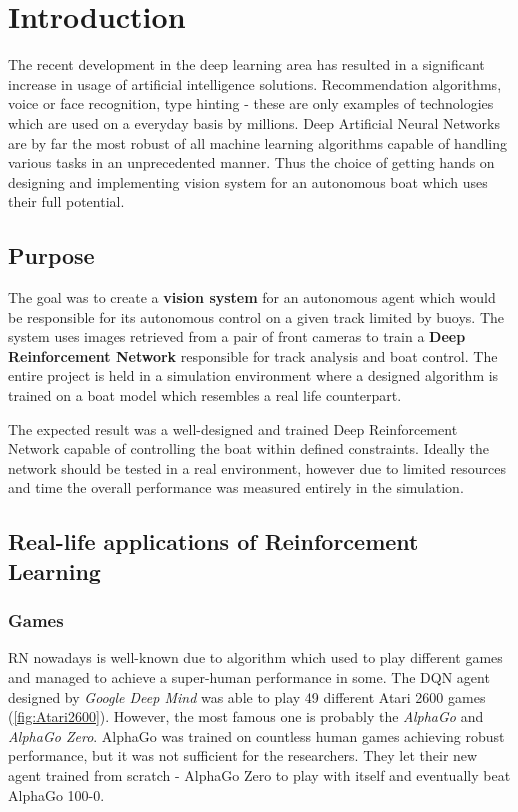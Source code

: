 \chapter{Introduction}
\label{cha:introduction}

The recent development in the deep learning area has resulted in a significant increase in usage of artificial intelligence
solutions. Recommendation algorithms, voice or face recognition, type hinting - these are only examples of technologies which are
used on a everyday basis by millions. Deep Artificial Neural Networks are by far the most robust of all machine learning
algorithms capable of handling various tasks in an unprecedented manner. Thus the choice of getting hands on designing and
implementing vision system for an autonomous boat which uses their full potential.

\section{Purpose}
\label{sec:purpose}

The goal was to create a \textbf{vision system} for an autonomous agent which would be responsible for its autonomous control on a given
track limited by buoys. The system uses images retrieved from a pair of front cameras to train a \textbf{Deep Reinforcement Network}
responsible for track analysis and boat control. The entire project is held in a simulation environment where a designed algorithm is
trained on a boat model which resembles a real life counterpart. 

The expected result was a well-designed and trained Deep Reinforcement Network capable of controlling the boat within defined constraints.
Ideally the network should be tested in a real environment, however due to limited resources and time the overall performance was measured
entirely in the simulation.

\section{Real-life applications of Reinforcement Learning}
\label{sec:real-life-applications-of-deep-learning}

\subsection{Games}
\label{sub:intro-games}
RN nowadays is well-known due to algorithm which used to play different games and managed to achieve a super-human performance in some.
The DQN agent designed by \emph{Google Deep Mind} was able to play 49 different Atari 2600 games (\ref{fig:Atari2600}). However, the most
famous one is probably the \emph{AlphaGo} \cite{AlphaGO}  and \emph{AlphaGo Zero}. AlphaGo was trained on countless human games achieving
robust performance, but it was not sufficient for the researchers. They let their new agent trained from scratch - AlphaGo Zero to play with
itself and eventually beat AlphaGo 100-0. 

